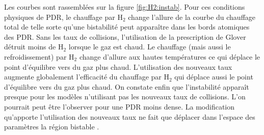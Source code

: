 Les courbes sont rassemblées sur la figure \ref{fig:H2:instab}. Pour ces conditions physiques de PDR, le chauffage par $\mathrm{H}_2$ change l'allure de la courbe du chauffage total de telle sorte qu'une bistabilité peut apparaître dans les bords atomiques des PDR. Sans les taux de collisions, l'utilisation de la prescription de Glover détruit moins de $\mathrm{H}_2$ lorsque le gaz est chaud. Le chauffage (mais aussi le refroidissement) par $\mathrm{H}_2$ change d'allure aux hautes températures ce qui déplace le point d'équilibre vers du gaz plus chaud. L'utilisation des nouveaux taux augmente globalement l'efficacité du chauffage par $\mathrm{H}_2$ qui déplace aussi le point d'équilibre vers du gaz plus chaud. On constate enfin que l'instabilité apparaît presque pour les modèles n'utilisant pas les nouveaux taux de collisions. L'on pourrait peut être l'observer pour une PDR moins dense. La modification qu'apporte l'utilisation des nouveaux taux ne fait que déplacer dans l'espace des paramètres la région bistable . 

